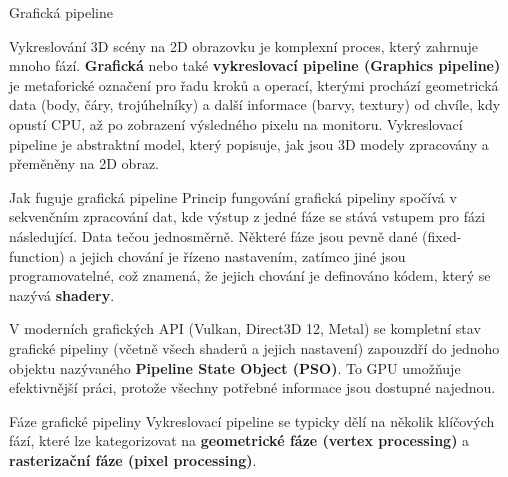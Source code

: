 \chap Grafická pipeline

Vykreslování 3D scény na 2D obrazovku je komplexní proces, který zahrnuje mnoho fází. {\bf Grafická} nebo také {\bf vykreslovací pipeline (Graphics pipeline)} je metaforické označení pro řadu kroků a operací, kterými prochází geometrická data (body, čáry, trojúhelníky) a další informace (barvy, textury) od chvíle, kdy opustí CPU, až po zobrazení výsledného pixelu na monitoru. Vykreslovací pipeline je abstraktní model, který popisuje, jak jsou 3D modely zpracovány a přeměněny na 2D obraz. 

\sec Jak fuguje grafická pipeline
Princip fungování grafická pipeliny spočívá v sekvenčním zpracování dat, kde výstup z jedné fáze se stává vstupem pro fázi následující. Data tečou jednosměrně. Některé fáze jsou pevně dané (fixed-function) a jejich chování je řízeno nastavením, zatímco jiné jsou programovatelné, což znamená, že jejich chování je definováno kódem, který se nazývá {\bf shadery}.

V moderních grafických API (Vulkan, Direct3D 12, Metal) se kompletní stav grafické pipeliny (včetně všech shaderů a jejich nastavení) zapouzdří do jednoho objektu nazývaného {\bf Pipeline State Object (PSO)}. To GPU umožňuje efektivnější práci, protože všechny potřebné informace jsou dostupné najednou. 

\sec Fáze grafické pipeliny
Vykreslovací pipeline se typicky dělí na několik klíčových fází, které lze kategorizovat na {\bf geometrické fáze (vertex processing)} a {\bf rasterizační fáze (pixel processing)}.

